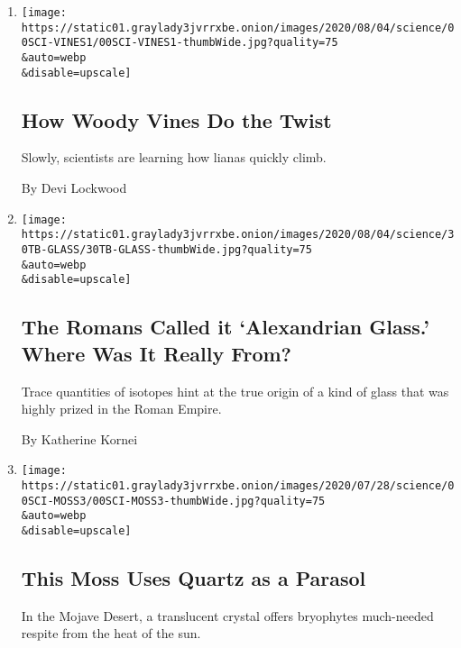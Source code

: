\begin{enumerate}
\def\labelenumi{\arabic{enumi}.}
\item
  \href{/2020/08/01/science/vines-lianas-panama.html}{}

  \texttt{[image: https://static01.graylady3jvrrxbe.onion/images/2020/08/04/science/00SCI-VINES1/00SCI-VINES1-thumbWide.jpg?quality=75\\\&auto=webp\\\&disable=upscale]}

  \hypertarget{how-woody-vines-do-the-twist}{%
  \subsection{How Woody Vines Do the
  Twist}\label{how-woody-vines-do-the-twist}}

  Slowly, scientists are learning how lianas quickly climb.

  By Devi Lockwood
\item
  \href{/2020/07/31/science/alexandrian-glass-rome.html}{}

  \texttt{[image: https://static01.graylady3jvrrxbe.onion/images/2020/08/04/science/30TB-GLASS/30TB-GLASS-thumbWide.jpg?quality=75\\\&auto=webp\\\&disable=upscale]}

  \hypertarget{the-romans-called-it-alexandrian-glass-where-was-it-really-from}{%
  \subsection{The Romans Called it `Alexandrian Glass.' Where Was It
  Really
  From?}\label{the-romans-called-it-alexandrian-glass-where-was-it-really-from}}

  Trace quantities of isotopes hint at the true origin of a kind of
  glass that was highly prized in the Roman Empire.

  By Katherine Kornei
\item
  \href{/2020/07/29/science/moss-quartz-biology-syntrichia.html}{}

  \texttt{[image: https://static01.graylady3jvrrxbe.onion/images/2020/07/28/science/00SCI-MOSS3/00SCI-MOSS3-thumbWide.jpg?quality=75\\\&auto=webp\\\&disable=upscale]}

  \hypertarget{this-moss-uses-quartz-as-a-parasol}{%
  \subsection{This Moss Uses Quartz as a
  Parasol}\label{this-moss-uses-quartz-as-a-parasol}}

  In the Mojave Desert, a translucent crystal offers bryophytes
  much-needed respite from the heat of the sun.


\end{enumerate}
